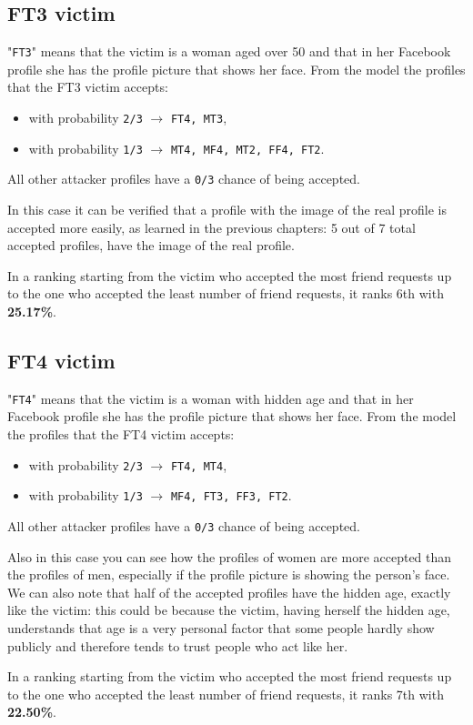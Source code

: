 \subsection*{FT3 victim}
"\texttt{FT3}" means that the victim is a woman aged over 50 and that in her Facebook profile she has the profile picture that shows her face.
From the model the profiles that the FT3 victim accepts:
\begin{itemize}
	\item with probability \texttt{2/3} $\rightarrow$ \texttt{FT4, MT3},
	\item with probability \texttt{1/3} $\rightarrow$ \texttt{MT4, MF4, MT2, FF4, FT2}.
\end{itemize}  
All other attacker profiles have a \texttt{0/3} chance of being accepted.
\par \noindent In this case it can be verified that a profile with the image of the real profile is accepted more easily, as learned in the previous chapters: 5 out of 7 total accepted profiles, have the image of the real profile.
\par \noindent In a ranking starting from the victim who accepted the most friend requests up to the one who accepted the least number of friend requests, it ranks 6th with \textbf{25.17\%}.


\subsection*{FT4 victim}
"\texttt{FT4}" means that the victim is a woman with hidden age and that in her Facebook profile she has the profile picture that shows her face.
From the model the profiles that the FT4 victim accepts:
\begin{itemize}
	\item with probability \texttt{2/3} $\rightarrow$ \texttt{FT4, MT4},
	\item with probability \texttt{1/3} $\rightarrow$ \texttt{MF4, FT3, FF3, FT2}.
\end{itemize}  
All other attacker profiles have a \texttt{0/3} chance of being accepted.
\par \noindent Also in this case you can see how the profiles of women are more accepted than the profiles of men, especially if the profile picture is showing the person's face. We can also note that half of the accepted profiles have the hidden age, exactly like the victim: this could be because the victim, having herself the hidden age, understands that age is a very personal factor that some people hardly show publicly and therefore tends to trust people who act like her.
\par \noindent In a ranking starting from the victim who accepted the most friend requests up to the one who accepted the least number of friend requests, it ranks 7th with \textbf{22.50\%}.


